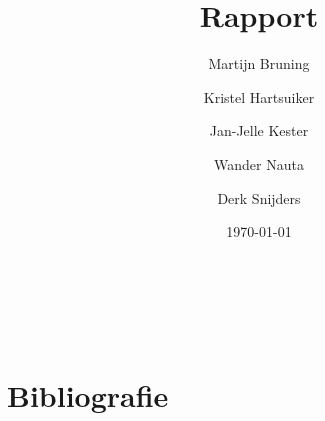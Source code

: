 \documentclass[twoside,openright,parskip]{scrreprt}
\title{Rapport}
\author{
     Martijn Bruning
\and Kristel Hartsuiker
\and Jan-Jelle Kester
\and Wander Nauta
\and Derk Snijders
}
\date{\today}
\begin{document}
\renewcommand*\rmdefault{ppl}
\renewcommand*\sfdefault{ppl}

\begin{titlepage}
	{\Huge \thetitle} \\
	\vfill
	\theauthor \\
	\thedate
\end{titlepage}

\tableofcontents





















\chapter{Bibliografie}

\begingroup
\renewcommand{\chapter}[2]{}
\begin{thebibliography}{9999}

\end{thebibliography}
\endgroup

\chapter{Index}

\begingroup
\renewcommand{\chapter}[2]{}
\printindex
\endgroup

\chapter{Verklarende woordenlijst}

\printglossaries
\end{document}
